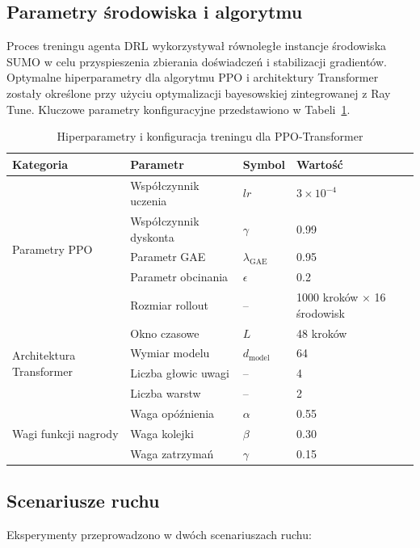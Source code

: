 \documentclass[12pt,a4paper]{article}
\begin{document}
\subsection{Parametry środowiska i algorytmu}

Proces treningu agenta DRL wykorzystywał równoległe instancje środowiska SUMO w celu przyspieszenia zbierania doświadczeń i stabilizacji gradientów. Optymalne hiperparametry dla algorytmu PPO i architektury Transformer zostały określone przy użyciu optymalizacji bayesowskiej zintegrowanej z Ray Tune. Kluczowe parametry konfiguracyjne przedstawiono w Tabeli~\ref{tab:1}.

\begin{table}[H]
\centering
\small
\setlength{\tabcolsep}{4pt}
\caption{Hiperparametry i konfiguracja treningu dla PPO-Transformer}
\label{tab:1}
\begin{tabularx}{\textwidth}{l>{\raggedright\arraybackslash}X l l}
\toprule
Kategoria & Parametr & Symbol & Wartość \\
\midrule
\multirow{5}{*}{Parametry PPO} & Współczynnik uczenia & $lr$ & $3 \times 10^{-4}$ \\
 & Współczynnik dyskonta & $\gamma$ & 0.99 \\
 & Parametr GAE & $\lambda_{\text{GAE}}$ & 0.95 \\
 & Parametr obcinania & $\epsilon$ & 0.2 \\
 & Rozmiar rollout & -- & 1000 kroków $\times$ 16 środowisk \\
\midrule
\multirow{4}{*}{Architektura Transformer} & Okno czasowe & $L$ & 48 kroków \\
 & Wymiar modelu & $d_{\text{model}}$ & 64 \\
 & Liczba głowic uwagi & -- & 4 \\
 & Liczba warstw & -- & 2 \\
\midrule
\multirow{3}{*}{Wagi funkcji nagrody} & Waga opóźnienia & $\alpha$ & 0.55 \\
 & Waga kolejki & $\beta$ & 0.30 \\
 & Waga zatrzymań & $\gamma$ & 0.15 \\
\bottomrule
\end{tabularx}
\end{table}

\subsection{Scenariusze ruchu}

Eksperymenty przeprowadzono w dwóch scenariuszach ruchu:
\end{document}
